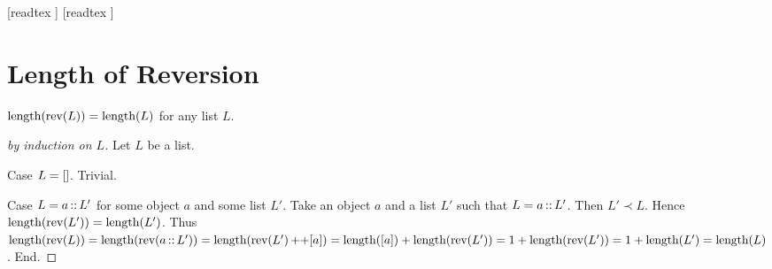 \documentclass[10pt]{article}
\begin{document}
  \begin{imports}
    \begin{forthel}
      [readtex ]
      [readtex ]
    \end{forthel}
  \end{imports}


  \section*{Length of Reversion}

  \begin{forthel}
    \begin{proposition}
      $\textrm{length}(\textrm{rev}(L)) = \textrm{length}(L)$ for any list $L$.
    \end{proposition}
    \begin{proof}[by induction on $L$]
      Let $L$ be a list.
      
      Case $L = []$. Trivial.
      
      Case $L = a \mathop{::} L'$ for some object $a$ and some list $L'$.
        Take an object $a$ and a list $L'$ such that $L = a \mathop{::} L'$.
        Then $L' \prec L$.
        Hence $\textrm{length}(\textrm{rev}(L')) = \textrm{length}(L')$.
        Thus $\textrm{length}(\textrm{rev}(L))
          = \textrm{length}(\textrm{rev}(a \mathop{::} L'))
          = \textrm{length}(\textrm{rev}(L') \mathop{++} [a])
          = \textrm{length}([a]) + \textrm{length}(\textrm{rev}(L'))
          = 1 + \textrm{length}(\textrm{rev}(L'))
          = 1 + \textrm{length}(L')
          = \textrm{length}(L)$.
      End.
    \end{proof}
  \end{forthel}
\end{document}
